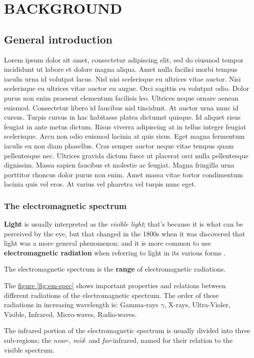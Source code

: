 \chapter{BACKGROUND}
\minitoc
\section{General introduction}
Lorem ipsum dolor sit amet, consectetur adipiscing elit, sed do eiusmod tempor incididunt ut labore et dolore magna aliqua. Amet nulla facilisi morbi tempus iaculis urna id volutpat lacus. Nisl nisi scelerisque eu ultrices vitae auctor. Nisi scelerisque eu ultrices vitae auctor eu augue. Orci sagittis eu volutpat odio. Dolor purus non enim praesent elementum facilisis leo. Ultrices neque ornare aenean euismod. Consectetur libero id faucibus nisl tincidunt. At auctor urna nunc id cursus. Turpis cursus in hac habitasse platea dictumst quisque. Id aliquet risus feugiat in ante metus dictum. Risus viverra adipiscing at in tellus integer feugiat scelerisque. Arcu non odio euismod lacinia at quis risus. Eget magna fermentum iaculis eu non diam phasellus. Cras semper auctor neque vitae tempus quam pellentesque nec. Ultrices gravida dictum fusce ut placerat orci nulla pellentesque dignissim. Massa sapien faucibus et molestie ac feugiat. Magna fringilla urna porttitor rhoncus dolor purus non enim. Amet massa vitae tortor condimentum lacinia quis vel eros. At varius vel pharetra vel turpis nunc eget.

\subsection{The electromagnetic spectrum}
\textbf{Light} is usually interpreted as the \textit{visible light}; that's because it is what can be perceived by the eye, but that changed in the 1800s when it was discovered that light was a more general phenomenon; and it is more common to use \textbf{electromagnetic radiation} when referring to light in its various forms \citep{ball2007}.

The electromagnetic spectrum is the \textbf{range} of electromagnetic radiations.

The \hyperref[fig:em-spec]{figure \ref{fig:em-spec}} shows important properties and relations between different radiations of the electromagnetic spectrum. The order of these radiations in increasing wavelength is: Gamma-rays $\gamma$, X-rays, Ultra-Violer, Visible, Infrared, Micro-waves, Radio-waves.

The infrared portion of the electromagnetic spectrum is usually divided into three sub-regions; the \textit{near}-, \textit{mid}- and \textit{far}-infrared, named for their relation to the visible spectrum.

